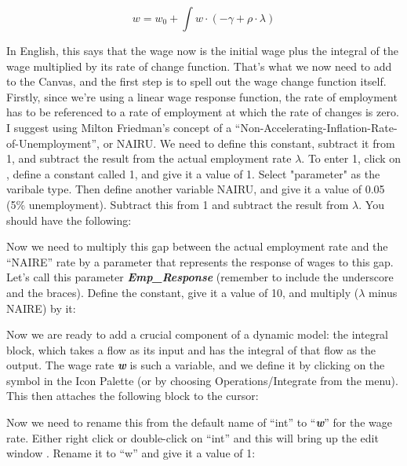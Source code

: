 \begin{displaymath}
w=w_0+\int w\cdot(-\gamma+\rho\cdot\lambda)
\end{displaymath}

In English, this says that the wage now is the initial wage plus the
integral of the wage multiplied by its rate of change function. That's
what we now need to add to the Canvas, and the first step is to spell
out the wage change function itself. Firstly, since we're using a
linear wage response function, the rate of employment has to be
referenced to a rate of employment at which the rate of changes is
zero.  I suggest using Milton Friedman's concept of a
``Non-Accelerating-Inflation-Rate-of-Unemployment'', or NAIRU. We need
to define this constant, subtract it from 1, and subtract the result
from the actual employment rate $\lambda$. To enter 1, click on , define a
constant called 1, and give it a value of 1. Select "parameter"
as the varibale type. Then define another variable
NAIRU, and give it a value of 0.05 (5\% unemployment). Subtract this
from 1 and subtract the result from $\lambda$. You should have the following:


Now we need to multiply this gap between the actual employment rate
and the ``NAIRE'' rate by a parameter that represents the response of
wages to this gap. Let's call this parameter {\bf\em Emp\_{Response}} (remember to include the underscore and the braces). Define the constant, give it a value of 10, and multiply ($\lambda$ minus NAIRE) by it:


Now we are ready to add a crucial component of a dynamic model: the
integral block, which takes a flow as its input and has the integral
of that flow as the output. The wage rate {\bf\em w} is such a variable, and we
define it by clicking on the  symbol in the Icon Palette (or by
choosing Operations/Integrate from the menu). This then attaches the
following block to the cursor: 

\begin{center}
\end{center}


Now we need to rename this from the default name of ``int'' to
``{\em\bf w}'' for the wage rate. Either right click or double-click
on ``int'' and this will bring up the edit window . Rename it to ``w'' and
give it a value of 1: 


